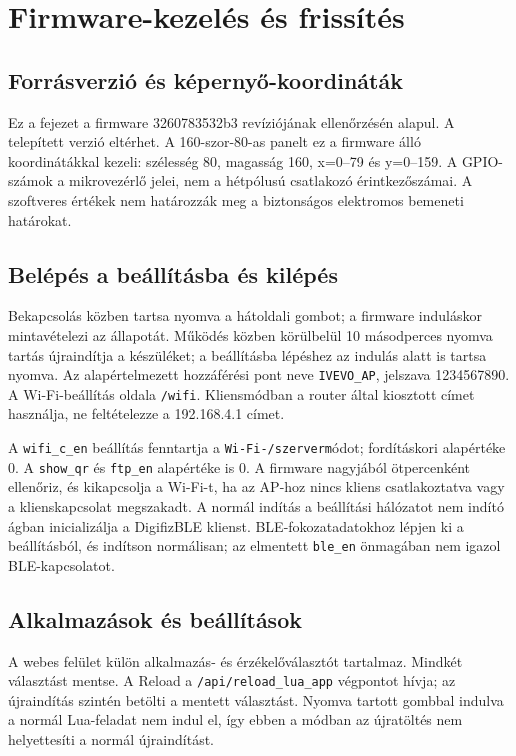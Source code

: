 \chapter{Firmware-kezelés és frissítés}\label{ch:firmware}
\section{Forrásverzió és képernyő-koordináták}
Ez a fejezet a firmware 3260783532b3 revíziójának ellenőrzésén alapul. A telepített verzió eltérhet. A 160-szor-80-as panelt ez a firmware álló koordinátákkal kezeli: szélesség 80, magasság 160, x=0–79 és y=0–159. A GPIO-számok a mikrovezérlő jelei, nem a hétpólusú csatlakozó érintkezőszámai. A szoftveres értékek nem határozzák meg a biztonságos elektromos bemeneti határokat.

\section{Belépés a beállításba és kilépés}
Bekapcsolás közben tartsa nyomva a hátoldali gombot; a firmware induláskor mintavételezi az állapotát. Működés közben körülbelül 10 másodperces nyomva tartás újraindítja a készüléket; a beállításba lépéshez az indulás alatt is tartsa nyomva. Az alapértelmezett hozzáférési pont neve \nolinkurl{IVEVO_AP}, jelszava 1234567890. A Wi-Fi-beállítás oldala \nolinkurl{/wifi}. Kliensmódban a router által kiosztott címet használja, ne feltételezze a 192.168.4.1 címet.

A \nolinkurl{wifi_c_en} beállítás fenntartja a \nolinkurl{Wi-Fi-/szerverm}ódot; fordításkori alapértéke 0. A \nolinkurl{show_qr} és \nolinkurl{ftp_en} alapértéke is 0. A firmware nagyjából ötpercenként ellenőriz, és kikapcsolja a Wi-Fi-t, ha az AP-hoz nincs kliens csatlakoztatva vagy a klienskapcsolat megszakadt. A normál indítás a beállítási hálózatot nem indító ágban inicializálja a DigifizBLE klienst. BLE-fokozatadatokhoz lépjen ki a beállításból, és indítson normálisan; az elmentett \nolinkurl{ble_en} önmagában nem igazol BLE-kapcsolatot.

\section{Alkalmazások és beállítások}
A webes felület külön alkalmazás- és érzékelőválasztót tartalmaz. Mindkét választást mentse. A Reload a \nolinkurl{/api/reload_lua_app} végpontot hívja; az újraindítás szintén betölti a mentett választást. Nyomva tartott gombbal indulva a normál Lua-feladat nem indul el, így ebben a módban az újratöltés nem helyettesíti a normál újraindítást.

